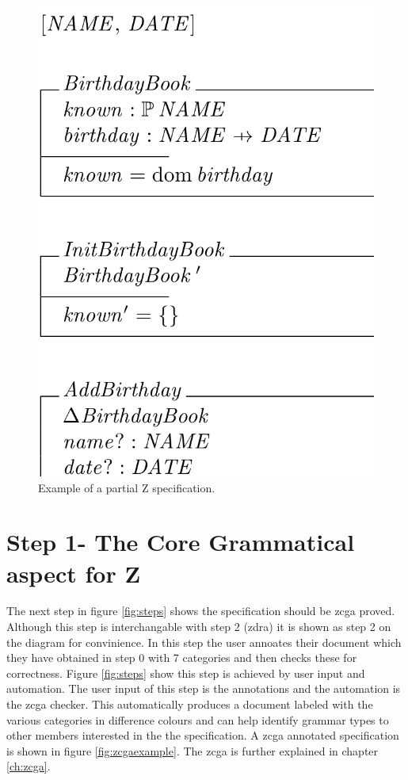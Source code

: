 \begin{figure}[H]
 \begin{center}
 \includegraphics [scale=0.2]{Figures/Design/zspec.png}
 \caption{Example of a partial Z specification.}
 \label{fig:zexample}
\end{center}
\end{figure} 

\section{Step 1- The Core Grammatical aspect for Z}

The next step in figure \ref{fig:steps} shows the specification should be \gls{zcga} proved. Although this step is interchangable with step 2 (\gls{zdra}) it is shown as step 2 on the diagram for convinience. In this step the user annoates their document which they have obtained in step 0 with 7 categories and then checks these for correctness. Figure \ref{fig:steps} show this step is achieved by user input and automation. The user input of this step is the annotations and the automation is the \gls{zcga} checker. This automatically produces a document labeled with the various categories in difference colours and can help identify grammar types to other members interested in the the specification. A \gls{zcga} annotated specification is shown in figure \ref{fig:zcgaexample}. The \gls{zcga} is further explained in chapter \ref{ch:zcga}.


